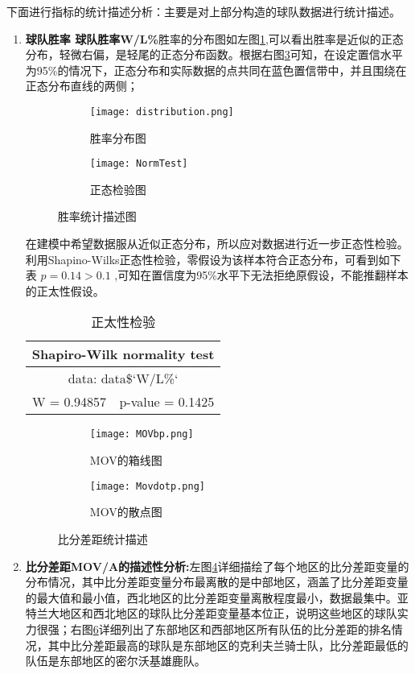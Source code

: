 下面进行指标的统计描述分析：主要是对上部分构造的球队数据进行统计描述。


\begin{enumerate}
	\item {\bfseries 球队胜率 球队胜率W/L\%}胜率的分布图如左图\ref{fig:2},可以看出胜率是近似的正态分布，轻微右偏，是轻尾的正态分布函数。根据右图\ref{fig:3}可知，在设定置信水平为95\%的情况下，正态分布和实际数据的点共同在蓝色置信带中，并且围绕在正态分布直线的两侧；
	\begin{figure}[h]
		
		\begin{subfigure}{0.5\textwidth}
			\texttt{[image: distribution.png]} 
			\caption{胜率分布图}
			\label{fig:2}
		\end{subfigure}
		\begin{subfigure}{0.5\textwidth}
			\texttt{[image: NormTest]}
			\caption{正态检验图}
			\label{fig:3}
		\end{subfigure}
	\caption{胜率统计描述图}
	\end{figure}
	在建模中希望数据服从近似正态分布，所以应对数据进行近一步正态性检验。
	利用Shapino-Wilks正态性检验，零假设为该样本符合正态分布，可看到如下表 $p=0.14>0.1$ ,可知在置信度为95\%水平下无法拒绝原假设，不能推翻样本的正太性假设。

	\begin{table}[h!]
			\begin{tabular}{|c|c|}
			\hline
			\multicolumn{2}{|c|}{Shapiro-Wilk normality test} \\
			\hline
			\multicolumn{2}{|c|}{ data:  data\$`W/L\%`} \\
			\hline
			W = 0.94857 &p-value = 0.1425\\
			\hline
		\end{tabular}
	\centering
	\label{4}
	\caption{正太性检验}
	\end{table}

	
\begin{figure}[h!]
	
	\begin{subfigure}{0.5\textwidth}
		\texttt{[image: MOVbp.png]} 
		\caption{MOV的箱线图}
		\label{fig:4}
	\end{subfigure}
	\begin{subfigure}{0.5\textwidth}
		\texttt{[image: Movdotp.png]}
		\caption{MOV的散点图}
		\label{fig:5}
	\end{subfigure}
\caption{比分差距统计描述}
\end{figure}
	\item  {\bfseries 比分差距MOV/A的描述性分析:}左图\ref{fig:4}详细描绘了每个地区的比分差距变量的分布情况，其中比分差距变量分布最离散的是中部地区，涵盖了比分差距变量的最大值和最小值，西北地区的比分差距变量离散程度最小，数据最集中。亚特兰大地区和西北地区的球队比分差距变量基本位正，说明这些地区的球队实力很强；右图\ref{fig:5}详细列出了东部地区和西部地区所有队伍的比分差距的排名情况，其中比分差距最高的球队是东部地区的克利夫兰骑士队，比分差距最低的队伍是东部地区的密尔沃基雄鹿队。


\end{enumerate}
